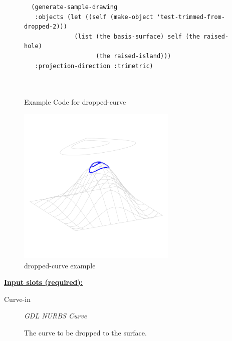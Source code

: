\documentclass [11pt]{book}
\begin{document}
\begin{itemize}
\begin{figure}
\begin{lrbox}{\boxedverb}
\begin{minipage}{\linewidth}
{\begin{verbatim}
  (generate-sample-drawing 
   :objects (let ((self (make-object 'test-trimmed-from-dropped-2)))
              (list (the basis-surface) self (the raised-hole) 
                    (the raised-island)))
   :projection-direction :trimetric)

 

\end{verbatim}}
\end{minipage}
\end{lrbox}
\fbox{\usebox{\boxedverb}}

\caption{Example Code for dropped-curve}

\label{fig:example-code-dropped-curve}

\end{figure}

\begin{figure}
\begin{center}
\includegraphics[width=3in,height=3in]{../images/example-dropped-curve.pdf}
\end{center}

\caption{dropped-curve example}

\label{fig:dropped-curve}

\end{figure}





\textbf{
\underline{Input slots (required):}}

\begin{description}

\item [Curve-in]
\emph{GDL NURBS Curve}

 The curve to be dropped to the surface.





\end{description}
\end{itemize}
\end{document}
